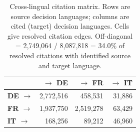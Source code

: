 \begin{table}[t]
\centering
\caption{Cross-lingual citation matrix. Rows are source decision languages; columns are cited (target) decision languages. Cells give resolved citation edges. Off-diagonal = 2,749,064 / 8,087,818 = 34.0\% of resolved citations with identified source and target language.}
\label{tab:cross_lang_citation}
\small
\begin{tabular}{l r r r}
\toprule
& \textbf{$\to$ DE} & \textbf{$\to$ FR} & \textbf{$\to$ IT} \\
\midrule
\textbf{DE $\to$} & 2,772,516 & 458,531 & 31,886 \\
\textbf{FR $\to$} & 1,937,750 & 2,519,278 & 63,429 \\
\textbf{IT $\to$} & 168,256 & 89,212 & 46,960 \\
\bottomrule
\end{tabular}
\end{table}
